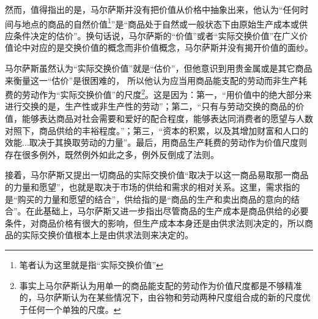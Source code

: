 然而，值得指出的是，马尔萨斯并没有把价值从价格中抽象出来，他认为“任何时间与地点的商品的自然价值\footnote{笔者认为这里就是指“实际交换价值”}”是“商品处于自然或一般状态下由原始生产成本或供应条件决定的估价”\cite[132]{MaErSaSiZhengZhiJingJiXueDingYi2023}。换句话说，马尔萨斯的“价值”或者“实际交换价值”在广义价值论中对应的是交换价值的概念而非价值概念，马尔萨斯并没有揭开价值的面纱。


马尔萨斯虽然认为“实际交换价值”就是“估价”，但他意识到用贵金属或是其它商品来衡量这一“估价”是很困难的\cite[98]{BiLuo*SiLaFaDaWeiLiJiaTuQuanJiDi2JuanMaErSaSiZhengZhiJingJiXueYuanLiPingZhu2013}，
所以他认为应当用商品能支配的劳动而非生产耗费的劳动作为“实际交换价值”的尺度\footnote{事实上马尔萨斯认为用单一的商品能支配的劳动作为价值尺度都是不够精准的，马尔萨斯认为在某些情况下，由谷物和劳动两种尺度组合成的新的尺度优于任何一个单独的尺度\cite[98-105]{BiLuo*SiLaFaDaWeiLiJiaTuQuanJiDi2JuanMaErSaSiZhengZhiJingJiXueYuanLiPingZhu2013}。}\cite[60-82, 92-97]{BiLuo*SiLaFaDaWeiLiJiaTuQuanJiDi2JuanMaErSaSiZhengZhiJingJiXueYuanLiPingZhu2013}\cite[133]{MaErSaSiZhengZhiJingJiXueDingYi2023}。这是因为：第一，“用价值中的绝大部分来进行交换的是，生产性或非生产性的劳动”\cite[92]{BiLuo*SiLaFaDaWeiLiJiaTuQuanJiDi2JuanMaErSaSiZhengZhiJingJiXueYuanLiPingZhu2013}；第二，“只有与劳动交换的商品的价值，能够表达商品对社会需要和爱好的配合程度，能够表达同消费者的愿望与人数对照下，商品供给的丰裕程度。”\cite[92]{BiLuo*SiLaFaDaWeiLiJiaTuQuanJiDi2JuanMaErSaSiZhengZhiJingJiXueYuanLiPingZhu2013}；第三，“资本的积累，以及其增加财富和人口的效能...取决于其换取劳动的力量”\cite[93]{BiLuo*SiLaFaDaWeiLiJiaTuQuanJiDi2JuanMaErSaSiZhengZhiJingJiXueYuanLiPingZhu2013}。最后，用商品生产耗费的劳动作为价值尺度则存在很多例外\cite[60-82]{BiLuo*SiLaFaDaWeiLiJiaTuQuanJiDi2JuanMaErSaSiZhengZhiJingJiXueYuanLiPingZhu2013}，既然例外如此之多，例外反倒成了法则\cite[171]{CaiJiMingCongGuDianZhengZhiJingJiXueDaoZhongGuoTeSeSheHuiZhuYiZhengZhiJingJiXueJiYuZhongGuoShiJiaoDeZhengZhiJingJiXueYanBianShangCe2023}。

接着，马尔萨斯又提出一切商品的实际交换价值“取决于以这一商品易取那一商品的力量和愿望”\cite[43]{BiLuo*SiLaFaDaWeiLiJiaTuQuanJiDi2JuanMaErSaSiZhengZhiJingJiXueYuanLiPingZhu2013}，也就是取决于市场的供给和需求的相对关系。这里，需求指的是“购买的力量和愿望的结合”\cite[43]{BiLuo*SiLaFaDaWeiLiJiaTuQuanJiDi2JuanMaErSaSiZhengZhiJingJiXueYuanLiPingZhu2013}，供给指的是“商品的生产和卖出商品的意向的结合”\cite[43]{BiLuo*SiLaFaDaWeiLiJiaTuQuanJiDi2JuanMaErSaSiZhengZhiJingJiXueYuanLiPingZhu2013}。在此基础上，马尔萨斯又进一步指出尽管商品的生产成本是商品供给的必要条件，对商品价格有很大的影响\cite[50，55]{BiLuo*SiLaFaDaWeiLiJiaTuQuanJiDi2JuanMaErSaSiZhengZhiJingJiXueYuanLiPingZhu2013}，但生产成本本身还是由供求法则决定的，所以商品的实际交换价值根本上是由供求法则来决定的\cite[59]{BiLuo*SiLaFaDaWeiLiJiaTuQuanJiDi2JuanMaErSaSiZhengZhiJingJiXueYuanLiPingZhu2013}。

